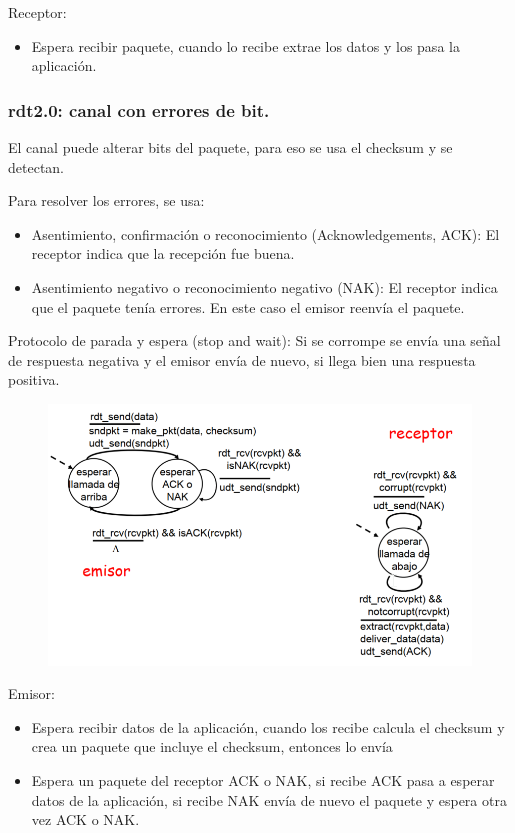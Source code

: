 \documentclass[12pt, twoside, openright]{report} %
\begin{document}
Receptor:

\begin{itemize}
	\item Espera recibir paquete, cuando lo recibe extrae los datos y los
	      pasa la aplicación.
\end{itemize}
\subsubsection{rdt2.0: canal con errores de bit.}

El canal puede alterar bits del paquete, para eso se usa el
checksum y se detectan.

Para resolver los errores, se usa:

\begin{itemize}
	\item Asentimiento, confirmación o reconocimiento (Acknowledgements,
	      ACK): El receptor indica que la recepción fue buena.
	\item Asentimiento negativo o reconocimiento negativo (NAK): El
	      receptor indica que el paquete tenía errores. En este caso el
	      emisor reenvía el paquete.
\end{itemize}

Protocolo de parada y espera (stop and wait): Si se corrompe se
envía una señal de respuesta negativa y el emisor envía de nuevo,
si llega bien una respuesta positiva.
\begin{figure}[H]
	{\includegraphics[scale=.45]{Untitled 11.png}}
\end{figure}
Emisor:

\begin{itemize}
	\item Espera recibir datos de la aplicación, cuando los recibe calcula
	      el checksum y crea un paquete que incluye el checksum, entonces
	      lo envía
	\item Espera un paquete del receptor ACK o NAK, si recibe ACK pasa a
	      esperar datos de la aplicación, si recibe NAK envía de nuevo el
	      paquete y espera otra vez ACK o NAK.
\end{itemize}
\end{document}
